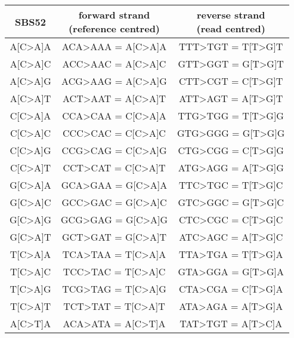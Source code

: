 \begingroup
\setlength{\LTleft}{-20cm plus -1fill} %
\setlength{\LTright}{\LTleft}
\begin{longtable}{c|c|c}
\label{tab:SBS52} \\ \smallskip
SBS52 & \makecell{forward strand \\ (reference centred)} & \makecell{reverse strand \\ (read centred)}  \\ \hline
\ttfamily A[C>A]A & \ttfamily ACA>AAA = A[C>A]A & \ttfamily TTT>TGT = T[T>G]T \\ \hline
\ttfamily A[C>A]C & \ttfamily ACC>AAC = A[C>A]C & \ttfamily GTT>GGT = G[T>G]T \\ \hline
\ttfamily A[C>A]G & \ttfamily ACG>AAG = A[C>A]G & \ttfamily CTT>CGT = C[T>G]T \\ \hline
\ttfamily A[C>A]T & \ttfamily ACT>AAT = A[C>A]T & \ttfamily ATT>AGT = A[T>G]T \\ \hline
\ttfamily C[C>A]A & \ttfamily CCA>CAA = C[C>A]A & \ttfamily TTG>TGG = T[T>G]G \\ \hline
\ttfamily C[C>A]C & \ttfamily CCC>CAC = C[C>A]C & \ttfamily GTG>GGG = G[T>G]G \\ \hline
\ttfamily C[C>A]G & \ttfamily CCG>CAG = C[C>A]G & \ttfamily CTG>CGG = C[T>G]G \\ \hline
\ttfamily C[C>A]T & \ttfamily CCT>CAT = C[C>A]T & \ttfamily ATG>AGG = A[T>G]G \\ \hline
\ttfamily G[C>A]A & \ttfamily GCA>GAA = G[C>A]A & \ttfamily TTC>TGC = T[T>G]C \\ \hline
\ttfamily G[C>A]C & \ttfamily GCC>GAC = G[C>A]C & \ttfamily GTC>GGC = G[T>G]C \\ \hline
\ttfamily G[C>A]G & \ttfamily GCG>GAG = G[C>A]G & \ttfamily CTC>CGC = C[T>G]C \\ \hline
\ttfamily G[C>A]T & \ttfamily GCT>GAT = G[C>A]T & \ttfamily ATC>AGC = A[T>G]C \\ \hline
\ttfamily T[C>A]A & \ttfamily TCA>TAA = T[C>A]A & \ttfamily TTA>TGA = T[T>G]A \\ \hline
\ttfamily T[C>A]C & \ttfamily TCC>TAC = T[C>A]C & \ttfamily GTA>GGA = G[T>G]A \\ \hline
\ttfamily T[C>A]G & \ttfamily TCG>TAG = T[C>A]G & \ttfamily CTA>CGA = C[T>G]A \\ \hline
\ttfamily T[C>A]T & \ttfamily TCT>TAT = T[C>A]T & \ttfamily ATA>AGA = A[T>G]A \\ \hline
\ttfamily A[C>T]A & \ttfamily ACA>ATA = A[C>T]A & \ttfamily TAT>TGT = A[T>C]A \\ \hline

\end{longtable}
